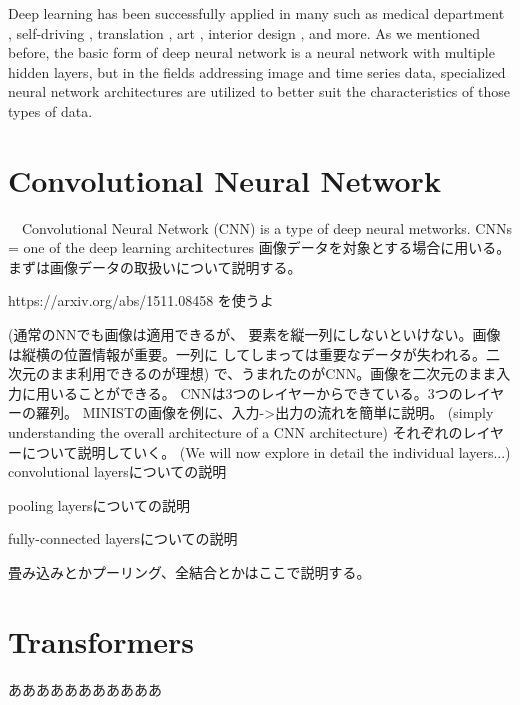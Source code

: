 Deep learning has been successfully applied in many such as medical department \cite{medical}, 
self-driving \cite{do2018real}, translation \cite{translation}, art \cite{zou2020stylized},
interior design \cite{interior}, and more.
As we mentioned before, the basic form of deep neural network is a neural network with 
multiple hidden layers, but in the fields addressing image and time series data,
specialized neural network architectures are utilized to better suit the 
characteristics of those types of data.

\section{Convolutional Neural Network}
　Convolutional Neural Network (CNN) is a type of deep neural metworks.
CNNs = one of the deep learning architectures
画像データを対象とする場合に用いる。まずは画像データの取扱いについて説明する。

https://arxiv.org/abs/1511.08458 を使うよ

(通常のNNでも画像は適用できるが、
要素を縦一列にしないといけない。画像は縦横の位置情報が重要。一列に
してしまっては重要なデータが失われる。二次元のまま利用できるのが理想)
で、うまれたのがCNN。画像を二次元のまま入力に用いることができる。
CNNは3つのレイヤーからできている。3つのレイヤーの羅列。
MINISTの画像を例に、入力->出力の流れを簡単に説明。
(simply understanding the overall architecture of a CNN architecture)
それぞれのレイヤーについて説明していく。
(We will now explore in detail the individual layers...)
convolutional layersについての説明

pooling layersについての説明

fully-connected layersについての説明


畳み込みとかプーリング、全結合とかはここで説明する。

\section{Transformers}
あああああああああああ

